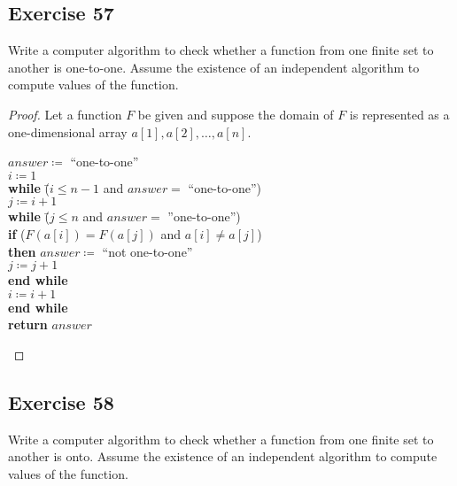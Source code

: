 \documentclass[14pt]{extarticle}
\begin{document}
\subsection{Exercise 57}
Write a computer algorithm to check whether a function from one finite set to another is one-to-one. Assume the
existence of an independent algorithm to compute values of the function.

\begin{proof}
    Let a function $F$ be given and suppose the domain of $F$ is represented as a one-dimensional array
    \(a[1], a[2], \ldots, a[n]\).

    \begin{tabbing}
        \(answer \coloneqq\) ``one-to-one'' \\
        \(i \coloneqq 1\) \\
        {\bf while} \= (\(i \leq n-1\) and \(answer = \) ``one-to-one'') \\
        \> \(j \coloneqq i + 1\) \\
        \> {\bf while} \= (\(j \leq n\) and \(answer =\) ''one-to-one'') \\
        \>             \> {\bf if} (\(F(a[i]) = F(a[j])\) and \(a[i] \neq a[j]\)) \\
        \>             \> {\bf then} \(answer \coloneqq \) ``not one-to-one'' \\
        \>             \> \(j \coloneqq j + 1\) \\
        \> {\bf end while} \\
        \(i \coloneqq i + 1\) \\
        {\bf end while} \\
        {\bf return} $answer$
    \end{tabbing}
\end{proof}

\subsection{Exercise 58}
Write a computer algorithm to check whether a function from one finite set to another is onto. Assume the existence of
an independent algorithm to compute values of the function.
\end{document}
